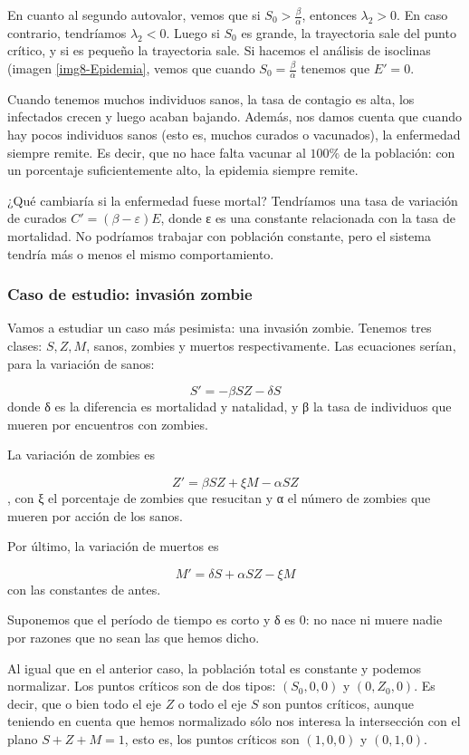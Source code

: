 En cuanto al segundo autovalor, vemos que si $S_0 > \frac{β}{α}$, entonces $λ_2 > 0$. En caso contrario, tendríamos $λ_2 < 0$. Luego si $S_0$ es grande, la trayectoria sale del punto crítico, y si es pequeño la trayectoria sale. Si hacemos el análisis de isoclinas (imagen \ref{img8-Epidemia}, vemos que cuando $S_0 = \frac{β}{α}$ tenemos que $E' = 0$.

Cuando tenemos muchos individuos sanos, la tasa de contagio es alta, los infectados crecen y luego acaban bajando. Además, nos damos cuenta que cuando hay pocos individuos sanos (esto es, muchos curados o vacunados), la enfermedad siempre remite. Es decir, que no hace falta vacunar al $100\%$ de la población: con un porcentaje suficientemente alto, la epidemia siempre remite.

¿Qué cambiaría si la enfermedad fuese mortal? Tendríamos una tasa de variación de curados $C' = (β-ε) E$, donde ε es una constante relacionada con la tasa de mortalidad. No podríamos trabajar con población constante, pero el sistema tendría más o menos el mismo comportamiento.

\subsubsection{Caso de estudio: invasión zombie}

Vamos a estudiar un caso más pesimista: una invasión zombie. Tenemos tres clases: $S, Z, M$, sanos, zombies y muertos respectivamente. Las ecuaciones serían, para la variación de sanos:

\[ S' = -βSZ - δS \] donde δ es la diferencia es mortalidad y natalidad, y β la tasa de individuos que mueren por encuentros con zombies.

La variación de zombies es

\[ Z' = βSZ + ξM - αSZ \], con ξ el porcentaje de zombies que resucitan y α el número de zombies que mueren por acción de los sanos.

Por último, la variación de muertos es

\[ M' = δS + αSZ - ξM \] con las constantes de antes.

Suponemos que el período de tiempo es corto y δ es $0$: no nace ni muere nadie por razones que no sean las que hemos dicho.

Al igual que en el anterior caso, la población total es constante y podemos normalizar. Los puntos críticos son de dos tipos: $(S_0, 0,0)$ y $(0,Z_0, 0)$. Es decir, que o bien todo el eje $Z$ o todo el eje $S$ son puntos críticos, aunque teniendo en cuenta que hemos normalizado sólo nos interesa la intersección con el plano $S+Z+M = 1$, esto es, los puntos críticos son $(1,0,0)$ y $(0,1,0)$.

